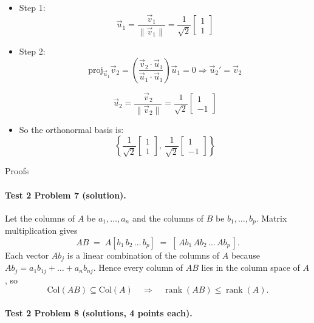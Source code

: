 \documentclass{article}
\begin{document}
\begin{multicols*}{2}
\begin{itemize}
  \item Step 1:
  \[
  \vec{u}_1 = \frac{\vec{v}_1}{\|\vec{v}_1\|} = 
  \frac{1}{\sqrt{2}} \begin{bmatrix} 1 \\ 1 \end{bmatrix}
  \]

  \item Step 2:
  \[
  \text{proj}_{\vec{u}_1} \vec{v}_2 = 
  \left( \frac{\vec{v}_2 \cdot \vec{u}_1}{\vec{u}_1 \cdot \vec{u}_1} \right)\vec{u}_1 
  = 0 \Rightarrow \vec{u}_2' = \vec{v}_2
  \]

  \[
  \vec{u}_2 = \frac{\vec{v}_2}{\|\vec{v}_2\|} = 
  \frac{1}{\sqrt{2}} \begin{bmatrix} 1 \\ -1 \end{bmatrix}
  \]

  \item So the orthonormal basis is:
  \[
  \left\{
    \frac{1}{\sqrt{2}} \begin{bmatrix} 1 \\ 1 \end{bmatrix},\ 
    \frac{1}{\sqrt{2}} \begin{bmatrix} 1 \\ -1 \end{bmatrix}
  \right\}
  \]
\end{itemize}


\Large Proofs
\footnotesize

\paragraph{Test 2 Problem 7 (solution).}
Let the columns of $A$ be $a_1,\dots ,a_n$ and the columns of $B$ be $b_1,\dots ,b_p$.  
Matrix multiplication gives  
$$
AB \;=\; A[b_1\, b_2\, \dots\, b_p] \;=\; [\,Ab_1\, Ab_2\, \dots\, Ab_p\,].
$$
Each vector $Ab_j$ is a linear combination of the columns of $A$ because $Ab_j = a_1b_{1j} + \dots + a_nb_{nj}$.  
Hence every column of $AB$ lies in the column space of $A$, so  
$$
\text{Col}(AB) \subseteq \text{Col}(A) \quad\Longrightarrow\quad
\operatorname{rank}(AB) \le \operatorname{rank}(A).
$$

\vspace{1em}

\paragraph{Test 2 Problem 8 (solutions, 4 points each).}


\end{multicols*}
\end{document}

